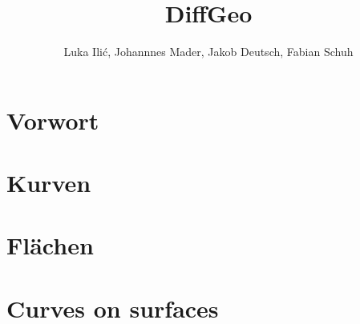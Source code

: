 \documentclass[a4paper,oneside,11pt,DIV=12,parskip=half]{scrartcl}
\title{DiffGeo}
\author{ Luka Ili\'{c}, Johannnes Mader, Jakob Deutsch, Fabian Schuh}
\theoremstyle{plain}
\theoremstyle{definition}
\newtheorem{remark, definition}[theorem]{Bemerkung und Definition.}
\newtheorem{lemma, definition}[theorem]{Lemma und Definition.}
\newtheorem{theorem, definition}[theorem]{Satz und Definition.}
\theoremstyle{remark}
\newtheorem*{remark, example}{\textbf{Bemerkung und Beispiel}}
\begin{document}
\maketitle

\pagebreak

\tableofcontents

\pagebreak

\section*{Vorwort}

\pagebreak

\section{Kurven}

\pagebreak

\section{Flächen}


\section{Curves on surfaces}

\end{document}
